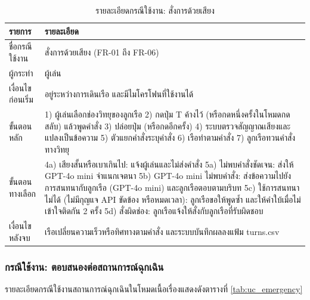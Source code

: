 \begin{table}[!htbp]
\centering
\caption{รายละเอียดกรณีใช้งาน: สั่งการด้วยเสียง}
\label{tab:uc_order}
\begin{tabular}{|L{3.50cm}|L{10.20cm}|}
\hline
\textbf{รายการ} & \textbf{รายละเอียด} \\
\hline
ชื่อกรณีใช้งาน & สั่งการด้วยเสียง (FR-01 ถึง FR-06) \\ \hline
ผู้กระทำ & ผู้เล่น \\ \hline
เงื่อนไขก่อนเริ่ม & อยู่ระหว่างการเดินเรือ และมีไมโครโฟนที่ใช้งานได้ \\ \hline
ขั้นตอนหลัก & 1) ผู้เล่นเลือกช่องวิทยุของลูกเรือ 2) กดปุ่ม T ค้างไว้ (หรือกดหนึ่งครั้งในโหมดกดสลับ) แล้วพูดคำสั่ง 3) ปล่อยปุ่ม (หรือกดอีกครั้ง) 4) ระบบตรวจสัญญาณเสียงและแปลงเป็นข้อความ 5) ตัวแยกคำสั่งระบุคำสั่ง 6) เรือทำตามคำสั่ง 7) ลูกเรือทวนคำสั่งทางวิทยุ \\ \hline
ขั้นตอนทางเลือก & 4a) เสียงสั้นหรือเบาเกินไป: แจ้งผู้เล่นและไม่ส่งคำสั่ง \newline 5a) ไม่พบคำสั่งชัดเจน: ส่งให้ GPT-4o mini จำแนกเจตนา \newline 5b) GPT-4o mini ไม่พบคำสั่ง: ส่งข้อความไปยังการสนทนากับลูกเรือ (GPT-4o mini) และลูกเรือตอบตามบริบท \newline 5c) ใช้การสนทนาไม่ได้ (ไม่มีกุญแจ API ขัดข้อง หรือหมดเวลา): ลูกเรือขอให้พูดซ้ำ และให้คำใบ้เมื่อไม่เข้าใจติดกัน 2 ครั้ง \newline 5d) สั่งผิดช่อง: ลูกเรือแจ้งให้สั่งกับลูกเรือที่รับผิดชอบ \\ \hline
เงื่อนไขหลังจบ & เรือเปลี่ยนความเร็วหรือทิศทางตามคำสั่ง และระบบบันทึกผลลงแฟ้ม turns.csv \\
\hline
\end{tabular}
\end{table}

\subsubsection{กรณีใช้งาน: ตอบสนองต่อสถานการณ์ฉุกเฉิน}

รายละเอียดกรณีใช้งานสถานการณ์ฉุกเฉินในโหมดเนื้อเรื่องแสดงดังตารางที่ \ref{tab:uc_emergency}

